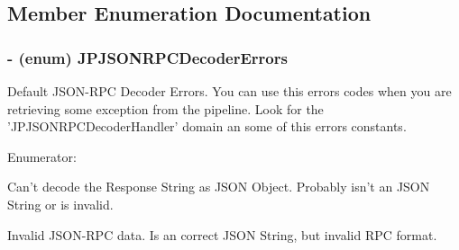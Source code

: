 \subsection{Member Enumeration Documentation}
\hypertarget{a00015_aba2b766c1b7742f5c636bbbd578df618}{
\subsubsection[{JPJSONRPCDecoderErrors}]{\setlength{\rightskip}{0pt plus 5cm}-\/ (enum) {\bf JPJSONRPCDecoderErrors}}}
\label{a00015_aba2b766c1b7742f5c636bbbd578df618}
Default JSON-\/RPC Decoder Errors. You can use this errors codes when you are retrieving some exception from the pipeline. Look for the {\ttfamily 'JPJSONRPCDecoderHandler'} domain an some of this errors constants. \begin{Desc}
\item[Enumerator: ]\par
\begin{description}
\item[{\em 
\hypertarget{a00015_aba2b766c1b7742f5c636bbbd578df618adaa30b18406ba5a080ea1dddc621b154}{
kJSONRPCCantDecode}
\label{a00015_aba2b766c1b7742f5c636bbbd578df618adaa30b18406ba5a080ea1dddc621b154}
}]Can't decode the Response String as JSON Object. Probably isn't an JSON String or is invalid. \item[{\em 
\hypertarget{a00015_aba2b766c1b7742f5c636bbbd578df618a2500b118aeb7e1f2d305c9edaa6e3376}{
kJSONRPCInvalid}
\label{a00015_aba2b766c1b7742f5c636bbbd578df618a2500b118aeb7e1f2d305c9edaa6e3376}
}]Invalid JSON-\/RPC data. Is an correct JSON String, but invalid RPC format. \end{description}
\end{Desc}



